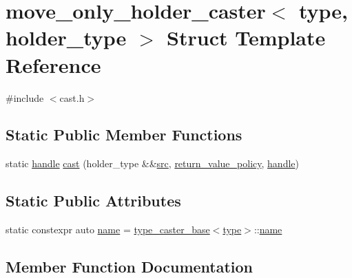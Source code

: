 \hypertarget{structmove__only__holder__caster}{}\section{move\+\_\+only\+\_\+holder\+\_\+caster$<$ type, holder\+\_\+type $>$ Struct Template Reference}
\label{structmove__only__holder__caster}


{\ttfamily \#include $<$cast.\+h$>$}

\subsection*{Static Public Member Functions}
\begin{DoxyCompactItemize}
\item 
static \mbox{\hyperlink{classhandle}{handle}} \mbox{\hyperlink{structmove__only__holder__caster_a99c0757cdabb82f4f254ad081e738492}{cast}} (holder\+\_\+type \&\&\mbox{\hyperlink{_s_d_l__opengl__glext_8h_a72e0fdf0f845ded60b1fada9e9195cd7}{src}}, \mbox{\hyperlink{detail_2common_8h_adde72ab1fb0dd4b48a5232c349a53841}{return\+\_\+value\+\_\+policy}}, \mbox{\hyperlink{classhandle}{handle}})
\end{DoxyCompactItemize}
\subsection*{Static Public Attributes}
\begin{DoxyCompactItemize}
\item 
static constexpr auto \mbox{\hyperlink{structmove__only__holder__caster_a6286ce9a51576874db390d75fde982d1}{name}} = \mbox{\hyperlink{classtype__caster__base}{type\+\_\+caster\+\_\+base}}$<$\mbox{\hyperlink{_s_d_l__opengl_8h_ad5ddf6fca7b585646515660e810e0188}{type}}$>$\+::\mbox{\hyperlink{structname}{name}}
\end{DoxyCompactItemize}


\subsection{Member Function Documentation}
\mbox{\label{structmove__only__holder__caster_a99c0757cdabb82f4f254ad081e738492}} 
